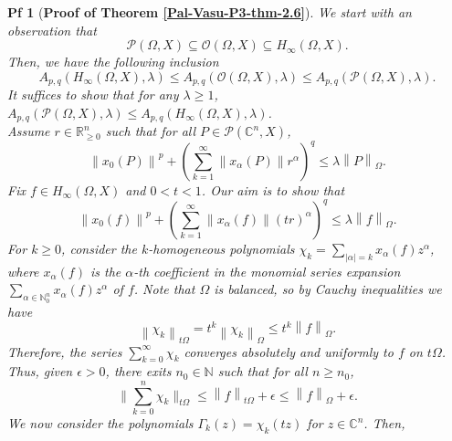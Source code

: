 \documentclass[10pt,a4paper]{amsart}
\newtheorem{pf}{Pf}
\newcommand{\norm}[1]{\left\lVert#1\right\rVert}
\begin{document}
\begin{pf} [{\bf Proof of Theorem \ref{Pal-Vasu-P3-thm-2.6}}]
	We start with an observation that 
	\begin{equation*}
		\mathcal{P}(\Omega, X)\subseteq \mathcal{O}(\Omega, X)\subseteq H_{\infty}(\Omega, X).
	\end{equation*}
	Then, we have the following inclusion
	\begin{equation*}
		A_{p,q}(H_{\infty}(\Omega, X), \lambda) \leq A_{p,q}(\mathcal{O}(\Omega, X), \lambda) \leq A_{p,q}(\mathcal{P}(\Omega, X), \lambda).
	\end{equation*}
	It suffices to show that for any $\lambda\geq 1$, $A_{p,q}(\mathcal{P}(\Omega, X), \lambda)\leq 	A_{p,q}(H_{\infty}(\Omega, X), \lambda)$.\\[2mm]
	Assume $r\in \mathbb{R}^n_{\geq 0}$ such that for all $P\in \mathcal{P}(\mathbb{C}^n, X)$,
	\begin{equation}\label{Pal-Vasu-P3-e-2.14}
		\norm{x_0(P)}^p+\left(\sum_{k=1}^{\infty}\norm{x_{\alpha}(P)}r^{\alpha}\right)^q\leq \lambda \norm{P}_{\Omega}.
	\end{equation}
	Fix $f\in H_{\infty}(\Omega, X)$ and $0<t<1$. Our aim is to show that 
	\begin{equation}\label{Pal-Vasu-P3-e-2.15}
		\norm{x_0(f)}^p+\left(\sum_{k=1}^{\infty}\norm{x_{\alpha}(f)}(tr)^{\alpha}\right)^q\leq \lambda \norm{f}_{\Omega}.
	\end{equation}
	For $k\geq 0$, consider the $k$-homogeneous polynomials $\chi_{k}=\sum_{|\alpha|=k}x_{\alpha}(f)z^{\alpha}$, where $x_{\alpha}(f)$ is the $\alpha$-th coefficient in the monomial series expansion $\sum_{\alpha\in \mathbb{N}^n_{0}}x_{\alpha}(f)z^{\alpha}$ of $f$. Note that $\Omega$ is balanced, so by Cauchy inequalities we have 
	\begin{equation}\label{Pal-Vasu-P3-e-2.16}
		\norm{\chi_{k}}_{t\Omega}=t^k\norm{\chi_{k}}_{\Omega}\leq t^k \norm{f}_{\Omega}.
	\end{equation}
	Therefore, the series $\sum_{k=0}^{\infty}\chi_{k}$ converges absolutely and uniformly to $f$ on $t\Omega$. Thus, given $\epsilon>0$, there exits $n_0 \in \mathbb{N}$ such that for all $n \geq n_0$,
	\begin{equation*}
		\bigg\|\sum_{k=0}^{n}\chi_{k}\bigg\|_{t\Omega}\leq \norm{f}_{t\Omega} + \epsilon \leq \norm{f}_{\Omega}+\epsilon.
	\end{equation*}
	We now consider the polynomials $\Gamma_{k}(z)=\chi_{k}(tz)$ for $z\in \mathbb{C}^n$. Then,
	\begin{equation*}

\end{equation*}
\end{pf}
\end{document}
